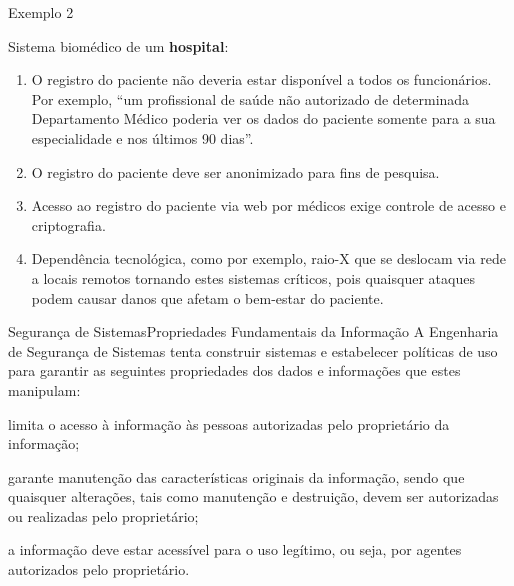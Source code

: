 \begin{frame}{Exemplo 2~\small\cite{ross2008}}\small

  Sistema biomédico de um {\bf hospital}:
  
  \begin{enumerate}[<+-| alert@+>]
  \item O registro do paciente não deveria estar disponível a todos os funcionários.
    Por exemplo, ``um profissional de saúde não autorizado de determinada Departamento Médico poderia ver os dados
    do paciente somente para a sua especialidade e nos últimos 90 dias''.
  \item O registro do paciente deve ser anonimizado para fins de pesquisa.
  \item Acesso ao registro do paciente via web por médicos exige controle de acesso e
    criptografia.
  \item Dependência tecnológica, como por exemplo, raio-X que se deslocam via rede
    a locais remotos tornando estes sistemas críticos, pois quaisquer ataques podem
    causar danos que afetam o bem-estar do paciente.
  \end{enumerate}
  
\end{frame}


\begin{frame}{Segurança de Sistemas}{Propriedades Fundamentais da Informação}
  A Engenharia de Segurança de Sistemas tenta construir sistemas e
  estabelecer políticas de uso para garantir as seguintes propriedades
  dos dados e informações que estes manipulam:

  \begin{description}[<+-| alert@+>]
  \item[Confidencialidade:] limita o acesso à informação às pessoas
    autorizadas pelo proprietário da informação;
  \item[Integridade:] garante manutenção das características originais
    da informação, sendo que quaisquer alterações, tais como
    manutenção e destruição, devem ser autorizadas ou realizadas pelo
    proprietário;
  \item[Disponibilidade:] a informação deve estar acessível para o uso
    legítimo, ou seja, por agentes autorizados pelo proprietário.
  \end{description}
  
\end{frame}


